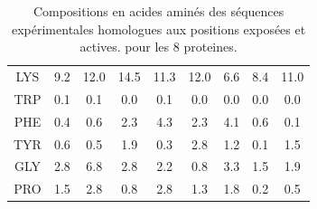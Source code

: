 \begin{table}[!htbp]
\begin{tabular}{ccccccccc}
        \cmidrule{1-9}
   LYS  & 9.2  & 12.0  & 14.5 & 11.3 & 12.0 & 6.6  &   8.4  &   11.0 \\                                          
        \cmidrule{1-9}
   TRP  & 0.1  & 0.1   & 0.0  & 0.1  & 0.0  & 0.0  &   0.0  &   0.0 \\                                         
        \cmidrule{1-9}
   PHE  & 0.4  & 0.6   & 2.3  & 4.3  & 2.3  & 4.1  &   0.6  &   0.1 \\                                         
        \cmidrule{1-9}
   TYR  & 0.6  & 0.5   & 1.9  & 0.3  & 2.8  & 1.2  &   0.1  &   1.5 \\
        \cmidrule{1-9}
   GLY  & 2.8  & 6.8   & 2.8  & 2.2  & 0.8  & 3.3  &   1.5  &   1.9 \\                                            
   PRO  & 1.5  & 2.8   & 0.8  & 2.8  & 1.3  & 1.8  &   0.2  &   0.5 \\                                         
        \bottomrule


      \end{tabular}      
      \caption{Compositions en acides aminés des séquences expérimentales homologues aux positions exposées et actives. pour les 8 proteines.}
\label{tab:freq_AA_ALL}      
    \end{table}


    \clearpage


